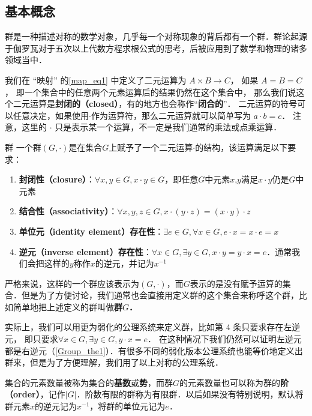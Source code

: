

\subsection{基本概念}
群是一种描述对称的数学对象，几乎每一个对称现象的背后都有一个群．群论起源于伽罗瓦对于五次以上代数方程求根公式的思考，后被应用到了数学和物理的诸多领域当中．

我们在 “映射” 的\autoref{map_eq1} 中定义了二元运算为 $A \times B \to C$， 如果 $A = B = C$， 即一个集合中的任意两个元素运算后的结果仍然在这个集合中， 那么我们说这个二元运算是\textbf{封闭的（closed）}，有的地方也会称作“\textbf{闭合的}”． 二元运算的符号可以任意决定，如果使用$\cdot$作为运算符，那么二元运算就可以简单写为 $a \cdot b=c$． 注意，这里的 $\cdot$ 只是表示某一个运算，不一定是我们通常的乘法或点乘运算．

\begin{definition}{群}\label{Group_def1}
一个群$(G, \cdot)$是在集合$G$上赋予了一个二元运算$\cdot$的结构，该运算满足以下要求：
\begin{enumerate}
\item \textbf{封闭性（closure）}：$\forall x, y\in G, x\cdot y\in G$，即任意$G$中元素$x$,$y$满足$x\cdot y$仍是$G$中元素
\item \textbf{结合性（associativity）}：$\forall x, y, z\in G, x\cdot(y\cdot z)=(x\cdot y)\cdot z$
\item \textbf{单位元（identity element）存在性}：$\exists e\in G, \forall x\in G, e\cdot x=x\cdot e=x$
\item \textbf{逆元（inverse element）存在性}：$\forall x\in G, \exists y\in G, x\cdot y=y\cdot x=e$．通常我们会把这样的$y$称作$x$的逆元，并记为$x^{-1}$
\end{enumerate}
\end{definition}
严格来说，这样的一个群应该表示为$(G,\cdot)$，而$G$表示的是没有赋予运算的集合．但是为了方便讨论，我们通常也会直接用定义群的这个集合来称呼这个群，比如简单地把上述定义的群叫做\textbf{群$G$．}

实际上，我们可以用更为弱化的公理系统来定义群，比如第 4 条只要求存在左逆元， 即只要求$\forall x\in G, \exists y\in G, y\cdot x=e$． 在这种情况下我们仍然可以证明左逆元都是右逆元（\autoref{Group_the1}）．有很多不同的弱化版本公理系统也能等价地定义出群来，但是为了方便理解，我们用了以上对称的公理系统．

集合的元素数量被称为集合的\textbf{基数}或\textbf{势}，而群$G$的元素数量也可以称为群的\textbf{阶（order）}，记作$|G|$．阶数有限的群称为有限群．以后如果没有特别说明，默认将群元素$x$的逆元记为$x^{-1}$，将群的单位元记为$e$．

